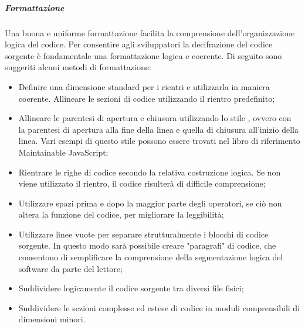 \documentclass[../NormeDiProgetto_v4.0.0.tex]{subfiles}
\begin{document}
                  \subparagraph{Formattazione}
                  Una buona e uniforme formattazione facilita la comprensione dell'organizzazione logica del codice. Per consentire agli sviluppatori la decifrazione del codice sorgente è fondamentale una formattazione logica e coerente.
                  Di seguito sono suggeriti alcuni metodi di formattazione:
                  \begin{itemize}
                        \item Definire una dimensione standard per i rientri e utilizzarla in maniera coerente. Allineare le sezioni di codice utilizzando il rientro predefinito;
                        \item Allineare le parentesi di apertura e chiusura utilizzando lo stile , ovvero con la parentesi di apertura alla fine della linea e quella di chiusura all'inizio della linea. Vari esempi di questo stile possono essere trovati nel libro di riferimento Maintainable JavaScript;
                        \item Rientrare le righe di codice secondo la relativa costruzione logica. Se non viene utilizzato il rientro, il codice risulterà di difficile comprensione;
                        \item Utilizzare spazi prima e dopo la maggior parte degli operatori, se ciò non altera la funzione del codice, per migliorare la leggibilità;
                        \item Utilizzare linee vuote per separare strutturalmente i blocchi di codice sorgente. In questo modo sarà possibile creare "paragrafi" di codice, che consentono di semplificare la comprensione della segmentazione logica del software da parte del lettore;
                        \item Suddividere logicamente il codice sorgente tra diversi file fisici;
                        \item Suddividere le sezioni complesse ed estese di codice in moduli comprensibili di dimensioni minori.
                  \end{itemize}
\end{document}
